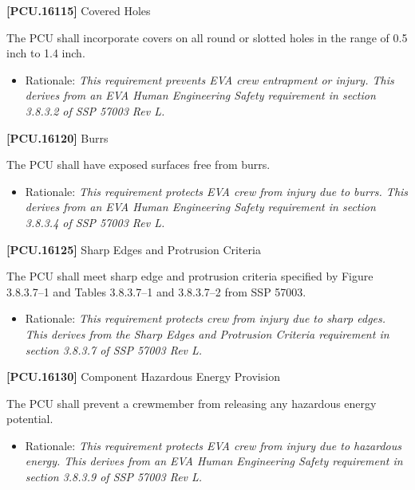 \textbf{[PCU.16115]} Covered Holes

The \gls{PCU} shall incorporate covers on all round or slotted holes in the range of 0.5 inch to 1.4 inch.

\begin{itemize}
\item{} Rationale: \emph{This requirement prevents EVA crew entrapment or injury. This derives from an EVA Human Engineering Safety requirement in section 3.8.3.2 of SSP 57003 Rev L.}

\end{itemize}

\textbf{[PCU.16120]} Burrs

The \gls{PCU} shall have exposed surfaces free from burrs.

\begin{itemize}
\item{} Rationale: \emph{This requirement protects EVA crew from injury due to burrs. This derives from an EVA Human Engineering Safety requirement in section 3.8.3.4 of SSP 57003 Rev L.}

\end{itemize}

\textbf{[PCU.16125]} Sharp Edges and Protrusion Criteria

The \gls{PCU} shall meet sharp edge and protrusion criteria specified by Figure 3.8.3.7--1 and Tables 3.8.3.7--1 and 3.8.3.7--2 from SSP 57003.

\begin{itemize}
\item{} Rationale: \emph{This requirement protects crew from injury due to sharp edges. This derives from the Sharp Edges and Protrusion Criteria requirement in section 3.8.3.7 of SSP 57003 Rev L.}

\end{itemize}

\textbf{[PCU.16130]} Component Hazardous Energy Provision

The \gls{PCU} shall prevent a crewmember from releasing any hazardous energy potential.

\begin{itemize}
\item{} Rationale: \emph{This requirement protects EVA crew from injury due to hazardous energy. This derives from an EVA Human Engineering Safety requirement in section 3.8.3.9 of SSP 57003 Rev L.}

\end{itemize}

